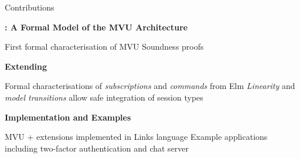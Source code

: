 \documentclass[11.5pt, aspectratio=169]{beamer}
\begin{document}
\begin{frame}{Contributions}
  \begin{fullpageitemize}
  \item {\Large \textbf{\mvu: A Formal Model of the MVU Architecture}}
    \begin{itemize}
      \itemR First formal characterisation of MVU
      \itemR Soundness proofs
    \end{itemize}
    \vspace{0.25em}

  \item {\Large \textbf{Extending \mvu}}
    \begin{itemize}
      \itemR Formal characterisations of \emph{subscriptions} and \emph{commands} from Elm
      \itemR \emph{Linearity} and \emph{model transitions} allow safe integration of session types
    \end{itemize}
    \vspace{0.25em}

  \item {\Large \textbf{Implementation and Examples}}
    \begin{itemize}
      \itemR MVU + extensions implemented in Links language
      \itemR Example applications including two-factor authentication and chat server
    \end{itemize}
  \end{fullpageitemize}
\end{frame}

\end{document}
